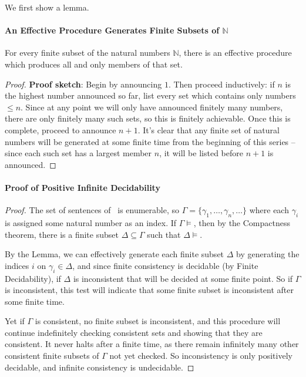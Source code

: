 We first show a lemma.
\paragraph{An Effective Procedure Generates Finite Subsets of $\mathbb{N}$}

\begin{lemma}
	For every finite subset of the natural numbers $\mathbb{N}$, there is an effective procedure which produces all and only members of that set. \begin{proof}
		{ \textbf{Proof sketch}: Begin by
		announcing $1$. Then proceed inductively: if $n$ is the highest
		number announced so far, list every set which contains only
		numbers $\leqslant n$.
		Since at any point we will only have announced finitely many
		numbers, there are only finitely many such sets, so this is
		finitely achievable. Once this is complete, proceed to announce
		$n+1$. It's clear that any
		finite set of natural numbers will be generated at some finite
		time from the beginning of this series – since each such set has a 
		largest member $n$, it will be listed before $n+1$ is announced.}
	\end{proof}
\end{lemma}

\paragraph{Proof of Positive Infinite Decidability}

\begin{proof}
 	 The set of sentences of \lone\ is enumerable, so
 $\Gamma = \{\gamma_{1},\ldots,\gamma_{n},\ldots\}$ where each $\gamma_{i}$ is
assigned some natural number as an index. If $\Gamma \vDash$, then  
by the Compactness theorem,
there is a finite subset $\Delta \subseteq \Gamma$ such that $\Delta 
\vDash$. 

By the Lemma, we can effectively generate each finite subset
 $\Delta$  by
generating the indices $i$ on $\gamma_{i}\in\Delta$, and since finite consistency is decidable (by Finite Decidability), if $\Delta$ is
inconsistent that will be decided at some finite point. So if
$\Gamma$ is inconsistent, this test will indicate that some finite
subset is inconsistent after some finite time.

Yet if $\Gamma$ is consistent, no finite subset is inconsistent,
and this procedure will continue indefinitely checking consistent 
sets and showing that they are consistent. It never halts after a finite time,
as there remain infinitely many other consistent finite subsets of
$\Gamma$ not yet checked. So inconsistency is only positively decidable, and infinite consistency is undecidable.  \end{proof}


